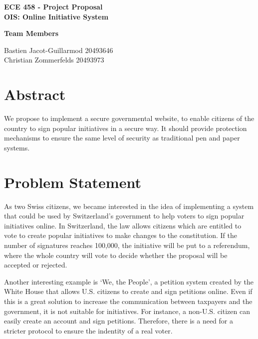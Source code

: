 \documentclass[12pt,letter,titlepage]{article}
\title{\mytitle}
\author{Bastien Jacot-Guillarmod, Christian Zommerfelds}
\begin{document}
\begin{center}
  {\bf \Large 
    ECE 458 - Project Proposal\\
   \LARGE
    OIS: Online Initiative System\\
  }
\end{center}
\vspace{0.2cm}

{\bf Team Members}
\vspace{0.1cm}

\noindent Bastien Jacot-Guillarmod \tabto{6cm} 20493646 \\
\noindent Christian Zommerfelds    \tabto{6cm} 20493973


\section{Abstract}
We propose to implement a secure governmental website, to enable citizens of the country to sign popular initiatives in a secure way. It should provide protection mechanisms to ensure the same level of security as traditional pen and paper systems.

\section{Problem Statement}
As two Swiss citizens, we became interested in the idea of implementing a system that could be used by Switzerland's government to help voters to sign popular initiatives online. In Switzerland, the law allows citizens which are entitled to vote to create popular initiatives to make changes to the constitution. If the number of signatures reaches 100,000, the initiative will be put to a referendum, where the whole country will vote to decide whether the proposal will be accepted or rejected.

Another interesting example is `We, the People', a petition system created by the White House that allows U.S. citizens to create and sign petitions online. Even if this is a great solution to increase the communication between taxpayers and the government, it is not suitable for initiatives. For instance, a non-U.S. citizen can easily create an account and sign petitions. Therefore, there is a need for a stricter protocol to ensure the indentity of a real voter.
\end{document}
